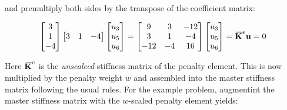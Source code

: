 and premultiply both sides by the transpose of the coefficient matrix:

\begin{equation}
    \begin{bmatrix}
        3 \\
        1 \\
        -4
    \end{bmatrix}
    \begin{bmatrix}
        3 & 1 & -4
    \end{bmatrix}
    \begin{bmatrix}
        u_3 \\
        u_5 \\
        u_6
    \end{bmatrix}
    =
    \begin{bmatrix}
        9 & 3 & -12 \\
        3 & 1 & -4 \\
        -12 & -4 & 16
    \end{bmatrix}
    \begin{bmatrix}
        u_3 \\
        u_5 \\
        u_6
    \end{bmatrix}
    = \mathbf{{}\mkern3mu\overline{\mkern-3muK}}^e \mathbf{u} = 0
\end{equation}

Here $ \mathbf{{}\mkern3mu\overline{\mkern-3muK}}^e $ is the \textit{unscaleed} stiffness matrix of
the penalty element. This is now multiplied by the penalty weight $ w $ and
assembled into the master stiffness matrix following the usual rules. For the
example problem, augmentint the master stiffness matrix with the $ w $-scaled
penalty element yields:

